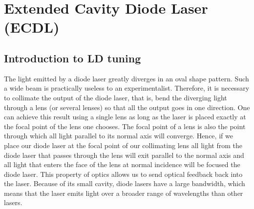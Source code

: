 \chapter{Extended Cavity Diode Laser (ECDL)}\label{ECDL}
	\section{Introduction to LD tuning}
The light emitted by a diode laser greatly diverges in an oval shape pattern. Such a wide beam is practically useless to an experimentalist. Therefore, it is necessary to collimate the output of the diode laser, that is, bend the diverging light through a lens (or several lenses) so that all the output goes in one direction. One can achieve this result using a single lens as long as the laser is placed exactly at the focal  point of the lens one chooses. The focal point of a lens is also the point through which all light parallel to its normal axis will converge. Hence, if we place our diode laser at the focal point of our collimating lens all light from the diode laser that passes through the lens will exit parallel to the normal axis and all light that enters the face of the lens at normal incidence will be focused the diode laser. This property of optics allows us to send optical feedback back into the laser. Because of its small cavity, diode lasers have a large bandwidth, which means that the laser emits light over a broader range of wavelengths than other lasers. 


